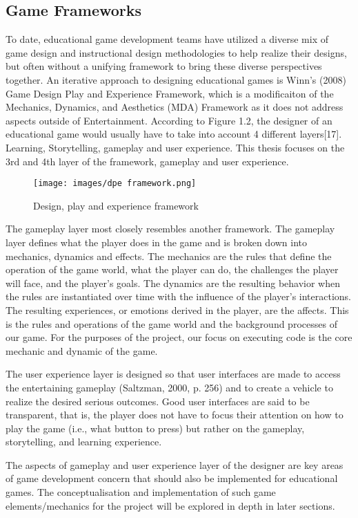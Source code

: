 \subsection{Game Frameworks}
To date, educational game development teams have utilized a diverse mix of game design and instructional design methodologies to help realize their designs, but often without a unifying framework to bring these diverse perspectives together. An iterative approach to designing educational games is Winn's (2008) Game Design Play and Experience Framework, which is a modificaiton of the Mechanics, Dynamics, and Aesthetics (MDA) Framework as it does not address aspects outside of Entertainment. According to Figure 1.2, the designer of an educational game would usually have to take into account 4 different layers[17]. Learning, Storytelling, gameplay and user experience. This thesis focuses on the 3rd and 4th layer of the framework, gameplay and user experience.

\begin{figure}[H]
    \centering
    \texttt{[image: images/dpe framework.png]}
    \caption{Design, play and experience framework}
\end{figure}


The gameplay layer most closely resembles another framework. The gameplay layer defines what the player does in the game and is broken down into mechanics, dynamics and effects. The mechanics are the rules that define the operation of the game world, what the player can do, the challenges the player will face, and the player’s goals. The dynamics are the resulting behavior when the rules are instantiated over time with the influence of the
player’s interactions. The resulting experiences, or emotions derived in the player, are the affects. This is the rules and operations of the game world and the background processes of our game. For the purposes of the project, our focus on executing code is the core mechanic and dynamic of the game.

The user experience layer is designed so that user interfaces are made to access the entertaining gameplay (Saltzman, 2000, p. 256) and to create a vehicle to realize the desired serious outcomes. Good user interfaces are said to be transparent, that is, the player does not have to focus their attention on how to play the game (i.e., what button to press) but rather on the gameplay, storytelling, and learning experience.

The aspects of gameplay and user experience layer of the designer are key areas of game development concern that should also be implemented for educational games. The conceptualisation and implementation of such game elements/mechanics for the project will be explored in depth in later sections.

